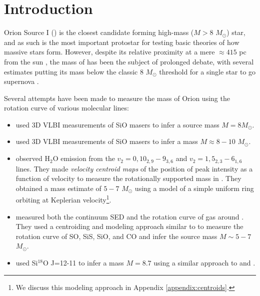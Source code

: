 \documentclass[twocolumn]{aastex61}
\let\oldarcsec\arcsec
\renewcommand\arcsec{\oldarcsec\xspace}%
\newcommand{\msun}{\ensuremath{M_{\odot}}\xspace}			%
\newcommand{\water}{H$_{2}$O\xspace}		%
\newcommand{\kms}{\textrm{km~s}\ensuremath{^{-1}}\xspace}	%
\begin{document}
\section{Introduction}
Orion Source I (\sourcei) is the closest candidate forming high-mass ($M>8$ \msun) star, 
and as such is the most important protostar for testing basic theories
of how massive stars form.  However, despite its relative proximity at
a mere $\approx415$ pc from the sun \citep{Menten2007a,Kim2008a}, the mass of \sourcei
has been the subject of prolonged debate, with several estimates
putting
its mass below the classic 8 \msun threshold for a single star to go supernova
\citep[][]{Heger2003}.


Several attempts have been made to measure the mass of Orion \sourcei using the
rotation curve of various molecular lines:
\begin{itemize}
    \item \citet{Kim2008a} used 3D VLBI measurements of SiO masers  to infer a
        source mass $M=8$\msun.
    \item \citet{Matthews2010a} used 3D VLBI measurements of SiO masers %
        to infer a mass $M\approx8-10$ \msun.
    \item \citet{Hirota2014a} observed \water emission
        from the $v_2=0, 10_{2,9}-9_{3,6}$ and  $v_2=1, 5_{2,3}-6_{1,6}$ lines.
        They made
        \textit{velocity centroid maps} of the position of peak intensity
        as a function of velocity to measure the rotationally supported
        mass in \sourcei.  They obtained a mass estimate of $5-7$ \msun
        using a model of a simple uniform
        ring orbiting at Keplerian velocity\footnote{We discuss this modeling
        approach in Appendix \ref{appendix:centroids}.}.
    \item \citet{Plambeck2016a} measured both the continuum SED and the rotation
        curve of gas around \sourcei.  They used a centroiding and modeling approach
        similar to \citet{Hirota2014a} to measure the rotation curve of
        SO, SiS, SiO, and CO and infer the source mass $M\sim5-7$ \msun.
    \item \citet{Hirota2017b} used Si$^{18}$O J=12-11 to infer a mass $M=8.7$
        using a similar approach to \citet{Hirota2014a} and \citet{Plambeck2016a}.
\end{itemize}
\end{document}
